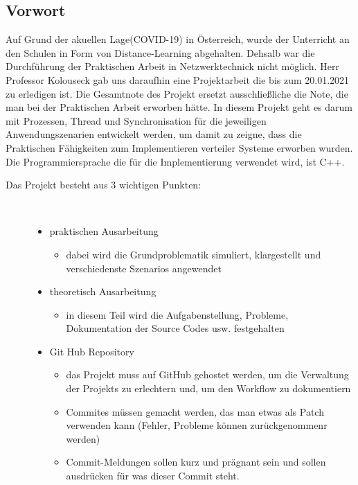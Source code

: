 \documentclass[a4paper,12pt]{article}
\begin{document}
\subsection{Vorwort}

Auf Grund der akuellen Lage(COVID-19) in Österreich, wurde der Unterricht an den Schulen
in Form von Distance-Learning abgehalten. Dehsalb war die Durchführung der Praktischen Arbeit in
Netzwerktechnick nicht möglich. Herr Professor Kolouseck gab uns daraufhin eine Projektarbeit die bis zum 
20.01.2021 zu erledigen ist. Die Gesamtnote des Projekt ersetzt ausschließliche die Note,
die man bei der Praktischen Arbeit erworben hätte. In diesem Projekt geht es darum mit Prozessen, Thread und Synchronisation
für die jeweiligen Anwendungszenarien entwickelt werden, um damit zu zeigne, dass die Praktischen
Fähigkeiten zum Implementieren verteiler Systeme erworben wurden. Die Programmiersprache die für
die Implementierung verwendet wird, ist C++.

\begin{description}
    \item[Das Projekt besteht aus 3 wichtigen Punkten:] ~\par
    \begin{itemize}
        \item praktischen Ausarbeitung
        \begin{itemize}
            \item  dabei wird die Grundproblematik simuliert, klargestellt und verschiedenste Szenarios angewendet 
        \end{itemize}
        \item theoretisch Ausarbeitung
        \begin{itemize}
            \item  in diesem Teil wird die Aufgabenstellung, Probleme, Dokumentation der Source Codes usw. festgehalten 
        \end{itemize}
        \item Git Hub Repository
        \begin{itemize}
            \item das Projekt muss auf GitHub gehostet werden, um die Verwaltung der Projekts zu erlechtern und, um den Workflow zu dokumentiern 
            \item Commites müssen gemacht werden, das man etwas als Patch verwenden kann (Fehler, Probleme können zurückgenommenr werden)
            \item Commit-Meldungen sollen kurz und prägnant sein und sollen ausdrücken für was dieser Commit steht.
        \end{itemize}
    \end{itemize} 
\end{description}
\end{document}
